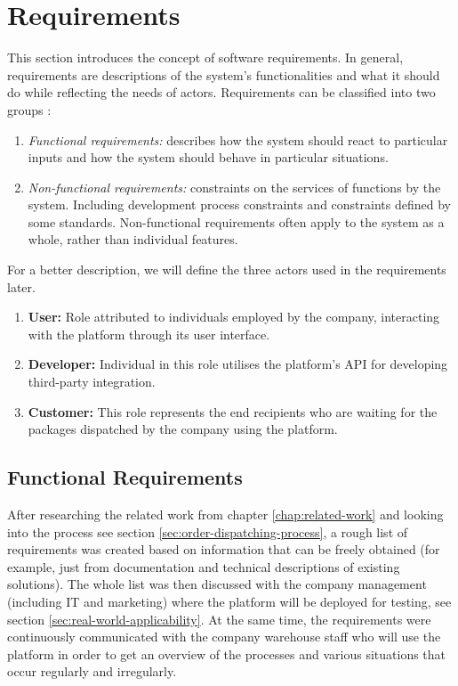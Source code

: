 \section{Requirements}
\label{sec:requirements}
This section introduces the concept of software requirements.
In general, requirements are descriptions of the system's functionalities and what it should do while reflecting the needs of actors.
Requirements can be classified into two groups \cite{sommervilleSW}:
\begin{enumerate}
    \item \textit{Functional requirements:} describes how the system should react to particular inputs and how the system should behave in particular situations.
    \item \textit{Non-functional requirements:} constraints on the services of functions by the system. Including development process constraints and constraints defined by some standards. Non-functional requirements often apply to the system as a whole, rather than individual features.
\end{enumerate}
For a better description, we will define the three actors used in the requirements later.
\label{sec:requirements-actors}
\begin{enumerate}
    \item \textbf{User:} Role attributed to individuals employed by the company, interacting with the platform through its user interface. 
    \item \textbf{Developer:} Individual in this role utilises the platform's API for developing third-party integration.
    \item \textbf{Customer:} This role represents the end recipients who are waiting for the packages dispatched by the company using the platform.
\end{enumerate}

\subsection{Functional Requirements}
\label{subsec:functional-requirements}
After researching the related work from chapter \ref{chap:related-work} and looking into the process see section \ref{sec:order-dispatching-process}, a rough list of requirements was created based on information that can be freely obtained (for example, just from documentation and technical descriptions of existing solutions).
The whole list was then discussed with the company management (including IT and marketing) where the platform will be deployed for testing, see section \ref{sec:real-world-applicability}. 
At the same time, the requirements were continuously communicated with the company warehouse staff who will use the platform in order to get an overview of the processes and various situations that occur regularly and irregularly.

